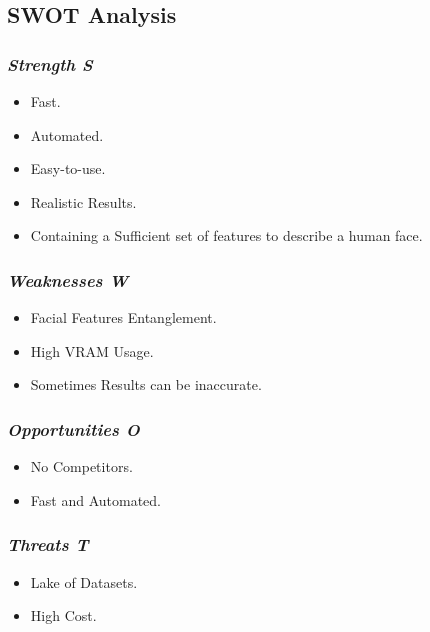 \subsection{ SWOT Analysis }

\subsubsection{ \emph{Strength S} }

\begin{itemize}
    \item Fast.
    \item Automated.
    \item Easy-to-use.
    \item Realistic Results.
    \item Containing a Sufficient set of features to describe a human face.
\end{itemize}

\subsubsection{ \emph{Weaknesses W} }

\begin{itemize}
    \item Facial Features Entanglement.
    \item High VRAM Usage.
    \item Sometimes Results can be inaccurate.
\end{itemize}

\subsubsection{ \emph{ Opportunities O}} 

\begin{itemize}
    \item No Competitors.
    \item Fast and Automated.
\end{itemize}

\subsubsection{\emph{Threats T} }

\begin{itemize}
    \item Lake of Datasets.
    \item High Cost.
\end{itemize}
